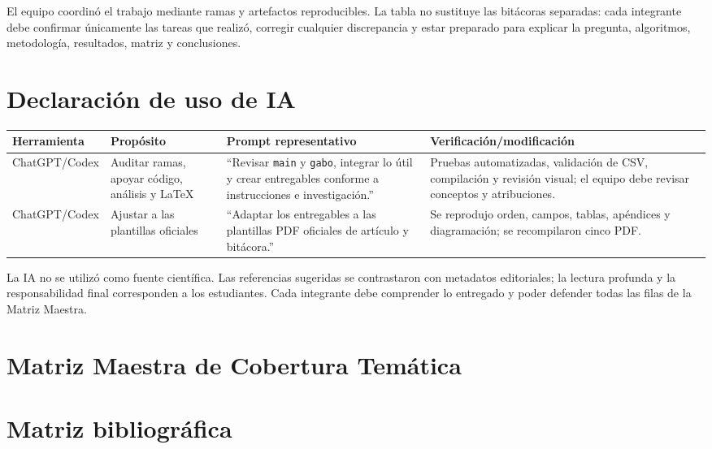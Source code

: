 \documentclass[11pt]{article}
\begin{document}
El equipo coordinó el trabajo mediante ramas y artefactos reproducibles. La tabla no sustituye las bitácoras separadas: cada integrante debe confirmar únicamente las tareas que realizó, corregir cualquier discrepancia y estar preparado para explicar la pregunta, algoritmos, metodología, resultados, matriz y conclusiones.

\section{Declaración de uso de IA}
\begin{table}[H]
\centering\footnotesize
\begin{tabularx}{\linewidth}{p{2.25cm}p{2.65cm}p{3.75cm}X}
\toprule Herramienta & Propósito & Prompt representativo & Verificación/modificación \\
\midrule
ChatGPT/Codex & Auditar ramas, apoyar código, análisis y LaTeX & ``Revisar \texttt{main} y \texttt{gabo}, integrar lo útil y crear entregables conforme a instrucciones e investigación.'' & Pruebas automatizadas, validación de CSV, compilación y revisión visual; el equipo debe revisar conceptos y atribuciones.\\
ChatGPT/Codex & Ajustar a las plantillas oficiales & ``Adaptar los entregables a las plantillas PDF oficiales de artículo y bitácora.'' & Se reprodujo orden, campos, tablas, apéndices y diagramación; se recompilaron cinco PDF.\\
\bottomrule
\end{tabularx}
\end{table}

La IA no se utilizó como fuente científica. Las referencias sugeridas se contrastaron con metadatos editoriales; la lectura profunda y la responsabilidad final corresponden a los estudiantes. Cada integrante debe comprender lo entregado y poder defender todas las filas de la Matriz Maestra.

\clearpage



\clearpage
\appendix
\section{Matriz Maestra de Cobertura Temática}


\clearpage
\section{Matriz bibliográfica}

\end{document}
